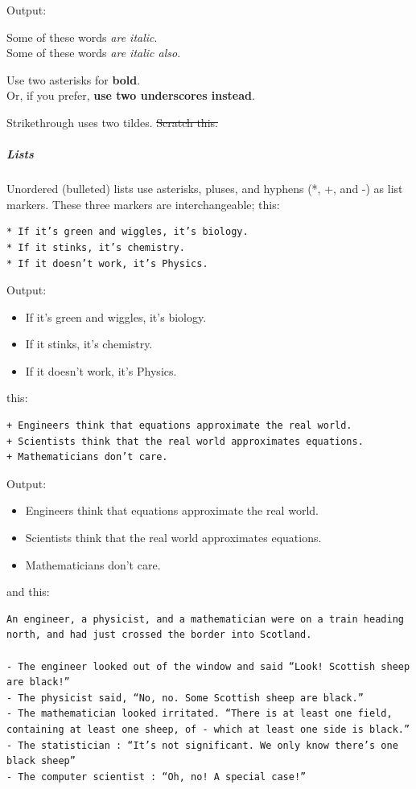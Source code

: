 \documentclass[]{book}
\providecommand{\tightlist}{%
  \setlength{\itemsep}{0pt}\setlength{\parskip}{0pt}}
\let\oldsubparagraph\subparagraph
\renewcommand{\subparagraph}[1]{\oldsubparagraph{#1}\mbox{}}
\theoremstyle{definition}
\theoremstyle{definition}
\theoremstyle{remark}
\begin{document}
Output:

Some of these words \emph{are italic}.\\
Some of these words \emph{are italic also}.

Use two asterisks for \textbf{bold}.\\
Or, if you prefer, \textbf{use two underscores instead}.

Strikethrough uses two tildes. \sout{Scratch this.}

\subparagraph{Lists}\label{lists}

Unordered (bulleted) lists use asterisks, pluses, and hyphens (*, +, and
-) as list markers. These three markers are interchangeable; this:

\begin{verbatim}
* If it’s green and wiggles, it’s biology.
* If it stinks, it’s chemistry.
* If it doesn’t work, it’s Physics.
\end{verbatim}

Output:

\begin{itemize}
\tightlist
\item
  If it's green and wiggles, it's biology.
\item
  If it stinks, it's chemistry.
\item
  If it doesn't work, it's Physics.
\end{itemize}

this:

\begin{verbatim}
+ Engineers think that equations approximate the real world.
+ Scientists think that the real world approximates equations.
+ Mathematicians don’t care.
\end{verbatim}

Output:

\begin{itemize}
\tightlist
\item
  Engineers think that equations approximate the real world.
\item
  Scientists think that the real world approximates equations.
\item
  Mathematicians don't care.
\end{itemize}

and this:

\begin{verbatim}
An engineer, a physicist, and a mathematician were on a train heading north, and had just crossed the border into Scotland.

- The engineer looked out of the window and said “Look! Scottish sheep are black!”
- The physicist said, “No, no. Some Scottish sheep are black.”
- The mathematician looked irritated. “There is at least one field, containing at least one sheep, of - which at least one side is black.”
- The statistician : “It’s not significant. We only know there’s one black sheep”
- The computer scientist : “Oh, no! A special case!”
\end{verbatim}
\end{document}
